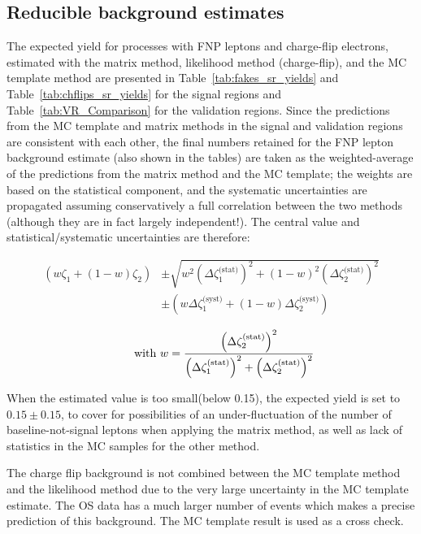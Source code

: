 \subsection*{Reducible background estimates}

The expected yield for processes with FNP leptons and charge-flip electrons, 
estimated with the matrix method, likelihood method (charge-flip), and the MC template method 
are presented in Table~\ref{tab:fakes_sr_yields} and Table~\ref{tab:chflips_sr_yields} for the signal regions and Table~\ref{tab:VR_Comparison} for the validation regions. 
Since the predictions from the MC template and matrix methods in the signal and validation regions are consistent 
with each other, 
the final numbers retained for the FNP lepton background estimate (also shown in the tables) 
are taken as the weighted-average of the predictions from the matrix method and the MC template; 
the weights are based on the statistical component, and the systematic uncertainties are propagated 
assuming conservatively a full correlation between the two methods (although they are in fact largely independent!). 
The central value and statistical/systematic uncertainties are therefore: 

\begin{equation}
\begin{aligned}
\left(w\zeta_1 + (1-w)\zeta_2\right) 
& \pm \sqrt{w^2\left(\Delta\zeta_1^\text{(stat)}\right)^2 + (1-w)^2\left(\Delta\zeta_2^\text{(stat)}\right)^2} \\
& \pm \left(w\Delta\zeta_1^\text{(syst)} + (1-w)\Delta\zeta_2^\text{(syst)}\right)
\end{aligned}
\end{equation}

$$\qquad\text{ with }w=\frac{\left(\Delta\zeta_2^\text{(stat)}\right)^2}{\left(\Delta\zeta_1^\text{(stat)}\right)^2+\left(\Delta\zeta_2^\text{(stat)}\right)^2}\notag$$

When the estimated value is too small(below 0.15), the expected yield is set to $0.15\pm 0.15$, 
to cover for possibilities of an under-fluctuation of the number of baseline-not-signal leptons 
when applying the matrix method, as well as lack of statistics in the MC samples for the other method. 

The charge flip background is not combined between the MC template method and the likelihood method due to the very large uncertainty in the MC template estimate.
The OS data has a much larger number of events which makes a precise prediction of this background. The MC template result is used as a cross check.

